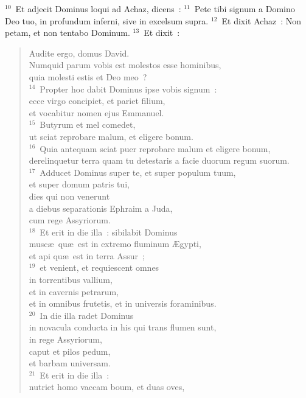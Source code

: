 ${}^{10}$~Et adjecit Dominus loqui ad Achaz, dicens~:
${}^{11}$~Pete tibi signum a Domino Deo tuo, in profundum inferni, sive in excelsum supra.
${}^{12}$~Et dixit Achaz~: Non petam, et non tentabo Dominum.
${}^{13}$~Et dixit~: \begin{flushleft}\begin{verse}Audite ergo, domus David.\\ Numquid parum vobis est molestos esse hominibus,\\ quia molesti estis et Deo meo~?\\
${}^{14}$~Propter hoc dabit Dominus ipse vobis signum~:\\ ecce virgo concipiet, et pariet filium,\\ et vocabitur nomen ejus Emmanuel.\\
${}^{15}$~Butyrum et mel comedet,\\ ut sciat reprobare malum, et eligere bonum.\\
${}^{16}$~Quia antequam sciat puer reprobare malum et eligere bonum,\\ derelinquetur terra quam tu detestaris a facie duorum regum suorum.\\
${}^{17}$~Adducet Dominus super te, et super populum tuum,\\ et super domum patris tui,\\ dies qui non venerunt\\ a diebus separationis Ephraim a Juda,\\ cum rege Assyriorum.\\
${}^{18}$~Et erit in die illa~: sibilabit Dominus\\ musc\ae\ qu\ae\ est in extremo fluminum \AE gypti,\\ et api qu\ae\ est in terra Assur~;\\
${}^{19}$~et venient, et requiescent omnes\\ in torrentibus vallium,\\ et in cavernis petrarum,\\ et in omnibus frutetis, et in universis foraminibus.\\
${}^{20}$~In die illa radet Dominus\\ in novacula conducta in his qui trans flumen sunt,\\ in rege Assyriorum,\\ caput et pilos pedum,\\ et barbam universam.\\
${}^{21}$~Et erit in die illa~:\\ nutriet homo vaccam boum, et duas oves,\\

\end{verse}
\end{flushleft}
